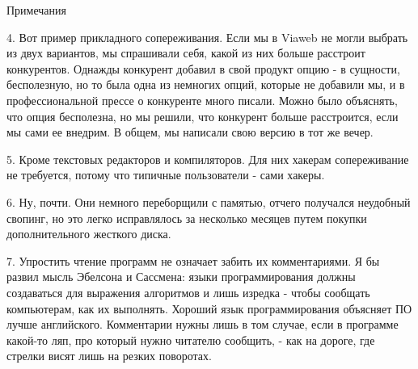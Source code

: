 \documentclass[ebook,12pt,oneside,openany]{memoir}
\begin{document}
Примечания

4. Вот пример прикладного сопереживания. Если мы в Viaweb не могли
выбрать из двух вариантов, мы спрашивали себя, какой из них больше
расстроит конкурентов. Однажды конкурент добавил в свой продукт опцию
- в сущности, бесполезную, но то была одна из немногих опций, которые
не добавили мы, и в профессиональной прессе о конкуренте много писали.
Можно было объяснять, что опция бесполезна, но мы решили, что
конкурент больше расстроится, если мы сами ее внедрим. В общем, мы
написали свою версию в тот же вечер.

5. Кроме текстовых редакторов и компиляторов. Для них хакерам
сопереживание не требуется, потому что типичные пользователи - сами
хакеры.

6. Ну, почти. Они немного переборщили с памятью, отчего получался
неудобный свопинг, но это легко исправлялось за несколько месяцев
путем покупки дополнительного жесткого диска.

7. Упростить чтение программ не означает забить их комментариями. Я бы
развил мысль Эбелсона и Сассмена: языки программирования должны
создаваться для выражения алгоритмов и лишь изредка - чтобы сообщать
компьютерам, как их выполнять. Хороший язык программирования объясняет
ПО лучше английского. Комментарии нужны лишь в том случае, если в
программе какой-то ляп, про который нужно читателю сообщить, - как на
дороге, где стрелки висят лишь на резких поворотах.
\end{document}
